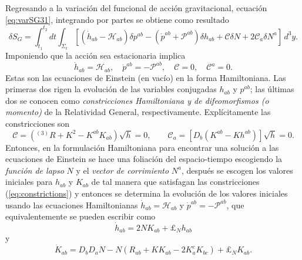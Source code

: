 Regresando a la variaci\'{o}n del funcional de acci\'{o}n gravitacional, ecuaci\'{o}n \eqref{eq:varSG31}, integrando por partes se obtiene como resultado
%
\begin{equation}
\label{varSGHamiltonianform}
\delta S_{G} = \int^{t_{2}}_{t_{1}} dt \int_{\Sigma_{t}} \left[ (\dot{h}_{ab} - \mathcal{H}_{ab}) \delta p^{ab} - (\dot{p}^{ab} + \mathcal{P}^{ab}) \delta h_{ab} + \mathcal{C} \delta N + 2 \mathcal{C}_{a} \delta N^{a} \right] \, d^{3} y.
\end{equation}
%
Imponiendo que la acci\'{o}n sea estacionaria implica
%
\begin{equation}
\label{eq:fieldequationsHamiltonianform}
\dot{h}_{ab} = \mathcal{H}_{ab}, \quad \dot{p}^{ab} = - \mathcal{P}^{ab}, \quad \mathcal{C} = 0, \quad \mathcal{C}^{a} = 0.
\end{equation}
%
Estas son las ecuaciones de Einstein (en vac\'{i}o) en la forma Hamiltoniana. Las primeras dos rigen la evoluci\'{o}n de las variables conjugadas $h_{ab}$ y $p^{ab}$; las \'{u}ltimas dos se conocen como \emph{constricciones Hamiltoniana y de difeomorfismos (o momento)} de la Relatividad General, respectivamente. Expl\'{i}citamente las constricciones son
%
\begin{equation}
\label{eq:constrictions}
\mathcal{C} = \left(^{(3)}R + K^{2} - K^{ab} K_{ab} \right) \sqrt{h} = 0, \qquad \mathcal{C}_{a} = \left[D_{b} (K^{ab} - K h^{ab}) \right] \sqrt{h} = 0.
\end{equation}
%
Entonces, en la formulaci\'{o}n Hamiltoniana para encontrar una soluci\'{o}n a las ecuaciones de Einstein se hace una foliaci\'{o}n del espacio-tiempo escogiendo la \emph{funci\'{o}n de lapso} $N$ y el \emph{vector de corrimiento} $N^{a}$, despu\'{e}s se escogen los valores iniciales para $h_{ab}$ y $K_{ab}$ de tal manera que satisfagan las constricciones (\ref{eq:constrictions}) y entonces se determina la evoluci\'{o}n de los valores iniciales usando las ecuaciones Hamiltonianas $\dot{h}_{ab} = \mathcal{H}_{ab}$ y $\dot{p}^{ab} = - \mathcal{P}^{ab}$, que equivalentemente se pueden escribir como
%
\begin{equation}
\dot{h}_{ab} = 2 N K_{ab} + \pounds_{N} h_{ab}
\end{equation}
%
y
%
\begin{equation}
\dot{K}_{ab} = D_{b} D_{a} N - N (R_{ab} + K K_{ab} - 2 K^{c}_{a} K_{bc}) + \pounds_{N} K_{ab}.
\end{equation}
